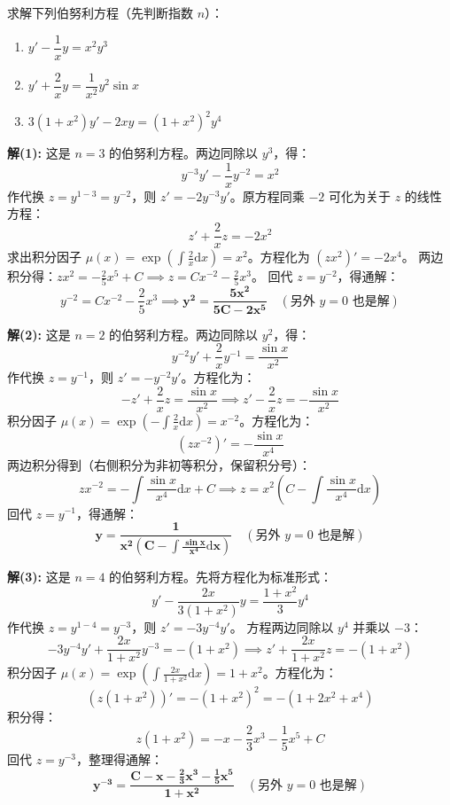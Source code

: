 \documentclass[lang=cn,11pt]{elegantbook}
\begin{document}
\begin{exercise}[基础：伯努利方程]
求解下列伯努利方程（先判断指数 $n$）：
\begin{enumerate}
  \item[(1)] $y'-\dfrac{1}{x}y=x^{2}y^{3}$
  \item[(2)] $y'+\dfrac{2}{x}y=\dfrac{1}{x^{2}}y^{2}\sin x$
  \item[(3)] $3(1+x^{2})y'-2xy=(1+x^{2})^{2}y^{4}$
\end{enumerate}
\end{exercise}
\begin{solution}
\textbf{解(1):}
这是 $n=3$ 的伯努利方程。两边同除以 $y^3$，得：
\[
y^{-3}y' - \frac{1}{x}y^{-2} = x^2
\]
作代换 $z = y^{1-3} = y^{-2}$，则 $z' = -2y^{-3}y'$。原方程同乘 $-2$ 可化为关于 $z$ 的线性方程：
\[
z' + \frac{2}{x}z = -2x^2
\]
求出积分因子 $\mu(x) = \exp\!\left(\int \frac{2}{x}\mathrm{d}x\right) = x^2$。方程化为 $(zx^2)' = -2x^4$。
两边积分得：$zx^2 = -\frac{2}{5}x^5 + C \implies z = Cx^{-2} - \frac{2}{5}x^3$。
回代 $z=y^{-2}$，得通解：
\[
y^{-2} = Cx^{-2} - \frac{2}{5}x^3 \implies \mathbf{y^2 = \frac{5x^2}{5C - 2x^5}} \quad (\text{另外 } y=0 \text{ 也是解})
\]

\textbf{解(2):}
这是 $n=2$ 的伯努利方程。两边同除以 $y^2$，得：
\[
y^{-2}y' + \frac{2}{x}y^{-1} = \frac{\sin x}{x^2}
\]
作代换 $z = y^{-1}$，则 $z' = -y^{-2}y'$。方程化为：
\[
-z' + \frac{2}{x}z = \frac{\sin x}{x^2} \implies z' - \frac{2}{x}z = -\frac{\sin x}{x^2}
\]
积分因子 $\mu(x) = \exp\!\left(-\int \frac{2}{x}\mathrm{d}x\right) = x^{-2}$。方程化为：
\[
(zx^{-2})' = -\frac{\sin x}{x^4}
\]
两边积分得到（右侧积分为非初等积分，保留积分号）：
\[
zx^{-2} = -\int \frac{\sin x}{x^4}\mathrm{d}x + C \implies z = x^2\left( C - \int \frac{\sin x}{x^4}\mathrm{d}x \right)
\]
回代 $z=y^{-1}$，得通解：
\[
\mathbf{y = \frac{1}{x^2\left( C - \displaystyle\int \frac{\sin x}{x^4}\mathrm{d}x \right)}} \quad (\text{另外 } y=0 \text{ 也是解})
\]

\textbf{解(3):}
这是 $n=4$ 的伯努利方程。先将方程化为标准形式：
\[
y' - \frac{2x}{3(1+x^2)}y = \frac{1+x^2}{3}y^4
\]
作代换 $z = y^{1-4} = y^{-3}$，则 $z' = -3y^{-4}y'$。
方程两边同除以 $y^4$ 并乘以 $-3$：
\[
-3y^{-4}y' + \frac{2x}{1+x^2}y^{-3} = -(1+x^2) \implies z' + \frac{2x}{1+x^2}z = -(1+x^2)
\]
积分因子 $\mu(x) = \exp\!\left(\int \frac{2x}{1+x^2}\mathrm{d}x\right) = 1+x^2$。方程化为：
\[
(z(1+x^2))' = -(1+x^2)^2 = -(1 + 2x^2 + x^4)
\]
积分得：
\[
z(1+x^2) = -x - \frac{2}{3}x^3 - \frac{1}{5}x^5 + C
\]
回代 $z=y^{-3}$，整理得通解：
\[
\mathbf{y^{-3} = \frac{C - x - \frac{2}{3}x^3 - \frac{1}{5}x^5}{1+x^2}} \quad (\text{另外 } y=0 \text{ 也是解})
\]
\end{solution}
\end{document}
